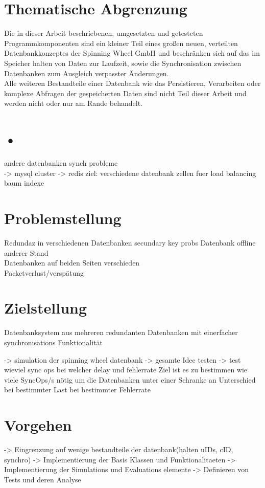 \documentclass[a4paper,11pt,oneside,%
headsepline,												%
footsepline,												%
bibtotocnumbered									%
]{scrreprt}
\begin{document}
\section{Thematische Abgrenzung}
Die in dieser Arbeit beschriebenen, umgesetzten und getesteten Programmkomponenten sind ein kleiner Teil eines großen neuen, verteilten Datenbankkonzeptes der Spinning Wheel GmbH und beschränken sich auf das im Speicher halten von Daten zur Laufzeit, sowie die Synchronisation zwischen Datenbanken zum Ausgleich verpasster Änderungen.\\
Alle weiteren Bestandteile einer Datenbank wie das Persistieren, Verarbeiten oder komplexe Abfragen der gespeicherten Daten sind nicht Teil dieser Arbeit und werden nicht oder nur am Rande behandelt.  

\section{•}
andere datenbanken synch probleme\\
-> mysql cluster
-> redis
ziel:
verschiedene datenbank zellen fuer load balancing
baum indexe

\section{Problemstellung}
Redundaz in verschiedenen Datenbanken
secundary key probs
Datenbank offline anderer Stand \\
Datenbanken auf beiden Seiten verschieden\\
Packetverlust/verspätung


\section{Zielstellung}
Datenbanksystem aus mehreren redundanten Datenbanken mit einerfacher synchronisations Funktionalität

-> simulation der spinning wheel datenbank
-> gesamte Idee testen
-> test wieviel sync ops bei welcher delay und fehlerrate
Ziel ist es zu bestimmen wie viele SyncOps/s nötig um die Datenbanken unter einer Schranke an Unterschied bei bestimmter Last bei bestimmter Fehlerrate

\section{Vorgehen}
-> Eingrenzung auf wenige bestandteile der datenbank(halten uIDs, cID, synchro)
-> Implementierung der Basis Klassen und Funktionalitaeten 
-> Implementierung der Simulations und Evaluations elemente
-> Definieren von Tests und deren Analyse
\end{document}
